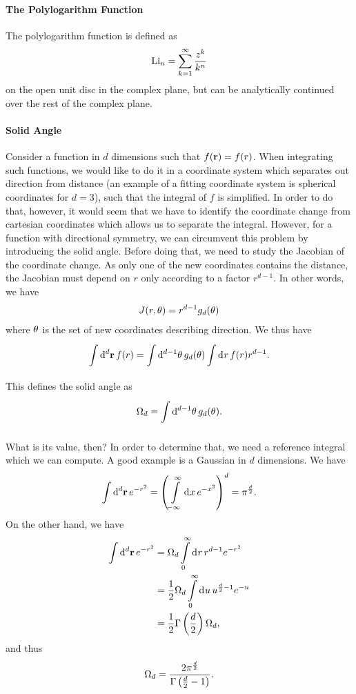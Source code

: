 \paragraph{The Polylogarithm Function}
The polylogarithm function is defined as
\begin{align*}
	\text{Li}_{n} = \sum\limits_{k = 1}^{\infty}\frac{z^{k}}{k^{n}}
\end{align*}
on the open unit disc in the complex plane, but can be analytically continued over the rest of the complex plane.

\paragraph{Solid Angle}
Consider a function in $d$ dimensions such that $f(\vb{r}) = f(r)$. When integrating such functions, we would like to do it in a coordinate system which separates out direction from distance (an example of a fitting coordinate system is spherical coordinates for $d = 3$), such that the integral of $f$ is simplified. In order to do that, however, it would seem that we have to identify the coordinate change from cartesian coordinates which allows us to separate the integral. However, for a function with directional symmetry, we can circumvent this problem by introducing the solid angle. Before doing that, we need to study the Jacobian of the coordinate change. As only one of the new coordinates contains the distance, the Jacobian must depend on $r$ only according to a factor $r^{d - 1}$. In other words, we have
\begin{align*}
	J(r, \vb{\theta}) = r^{d - 1}g_{d}(\vb{\theta})
\end{align*}
where $\vb{\theta}$ is the set of new coordinates describing direction. We thus have
\begin{align*}
	\int\limits_{}^{}\dd[d]{\vb{r}}f(r) = \int\limits_{}^{}\dd[d - 1]{\vb{\theta}}g_{d}(\vb{\theta})\int\limits_{}^{}\dd[]{r}f(r)r^{d - 1}.
\end{align*}
This defines the solid angle as
\begin{align*}
	\Omega_{d} = \int\limits_{}^{}\dd[d - 1]{\vb{\theta}}g_{d}(\vb{\theta}).
\end{align*}

What is its value, then? In order to determine that, we need a reference integral which we can compute. A good example is a Gaussian in $d$ dimensions. We have
\begin{align*}
	\int\limits_{}^{}\dd[d]{\vb{r}}e^{-r^{2}} = \left(\int\limits_{-\infty}^{\infty}\dd[]{x}e^{-x^{2}}\right)^{d} = \pi^{\frac{d}{2}}.
\end{align*}
On the other hand, we have
\begin{align*}
	\int\limits_{}^{}\dd[d]{\vb{r}}e^{-r^{2}} &= \Omega_{d}\int\limits_{0}^{\infty}\dd[]{r}r^{d - 1}e^{-r^{2}} \\
                                      &= \frac{1}{2}\Omega_{d}\int\limits_{0}^{\infty}\dd[]{u}u^{\frac{d}{2} - 1}e^{-u} \\
                                      &= \frac{1}{2}\Gamma\left(\frac{d}{2}\right)\Omega_{d},
\end{align*}
and thus
\begin{align*}
	\Omega_{d} = \frac{2\pi^{\frac{d}{2}}}{\Gamma\left(\frac{d}{2} - 1\right)}.
\end{align*}